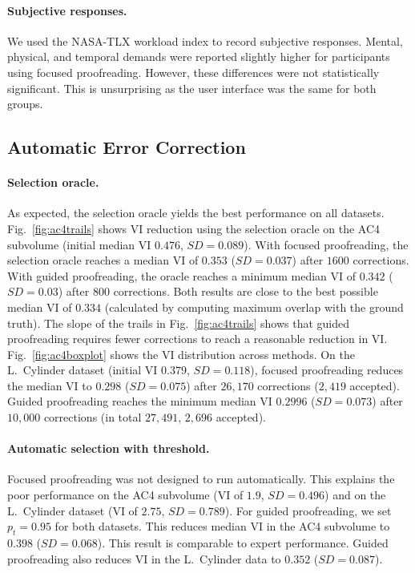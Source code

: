 \paragraph{Subjective responses.} We used the NASA-TLX workload index to record subjective responses. Mental, physical, and temporal demands were reported slightly higher for participants using focused proofreading. However, these differences were not statistically significant. This is unsurprising as the user interface was the same for both groups.


\subsection{Automatic Error Correction}

\paragraph{Selection oracle.} As expected, the selection oracle yields the best performance on all datasets. Fig.~\ref{fig:ac4trails} shows VI reduction using the selection oracle on the AC4 subvolume (initial median VI $0.476$, $SD=0.089$). With focused proofreading, the selection oracle reaches a median VI of $0.353$ ($SD=0.037$) after $1600$ corrections. With guided proofreading, the oracle reaches a minimum median VI of $0.342$ ($SD=0.03$) after $800$ corrections. Both results are close to the best possible median VI of $0.334$ (calculated by computing maximum overlap with the ground truth). The slope of the trails in Fig.~\ref{fig:ac4trails} shows that guided proofreading requires fewer corrections to reach a reasonable reduction in VI. Fig.~\ref{fig:ac4boxplot} shows the VI distribution across methods. On the L.~Cylinder dataset (initial VI $0.379$, $SD=0.118$), focused proofreading reduces the median VI to $0.298$ ($SD=0.075$) after $26,170$ corrections ($2,419$ accepted). Guided proofreading reaches the minimum median VI $0.2996$ ($SD=0.073$) after $10,000$ corrections (in total $27,491$, $2,696$ accepted).

\paragraph{Automatic selection with threshold.} Focused proofreading was not designed to run automatically. This explains the poor performance on the AC4 subvolume (VI of $1.9$, $SD=0.496$) and on the L.~Cylinder dataset (VI of $2.75$, $SD=0.789$). For guided proofreading, we set $p_t=0.95$ for both datasets. This reduces median VI in the AC4 subvolume to $0.398$ ($SD=0.068$). This result is comparable to expert performance. Guided proofreading also reduces VI in the L.~Cylinder data to $0.352$ ($SD=0.087$).

